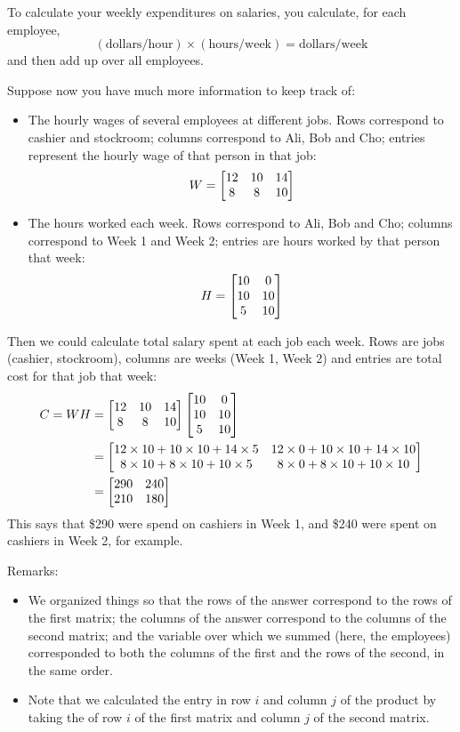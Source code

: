\begin{myexample}
To calculate your weekly expenditures on salaries, you
calculate, for each employee,
$$
(\textrm{dollars/hour}) \times (\textrm{hours/week}) = \textrm{dollars/week}
$$
and then add up over all employees.

Suppose now you have much more information to keep track of:
\begin{itemize} 
\item The hourly wages of several employees at different jobs.  Rows correspond to cashier and stockroom; columns correspond to  Ali, Bob and Cho; entries
represent the hourly wage of that person in that job:
$$
W = \left[ \begin{matrix}  12 & 10 & 14 \\ 8 & 8 & 10 \end{matrix} \right]
$$
\item The hours worked each week.  Rows correspond to Ali, Bob and Cho; columns
correspond to Week 1 and Week 2; entries are hours worked by that person that week:
$$
H = \left[ \begin{matrix} 10 & 0 \\ 10 & 10 \\ 5 & 10 \end{matrix} \right]
$$
\end{itemize}
Then we could calculate total salary spent at each job each week.  Rows are jobs (cashier, stockroom), columns are weeks (Week 1, Week 2) and entries are total cost for that job that week:
\begin{align*}
C = WH & =  \left[ \begin{matrix}  12 & 10 & 14 \\ 8 & 8 & 10 \end{matrix} \right] \left[ \begin{matrix} 10 & 0 \\ 10 & 10 \\ 5 & 10 \end{matrix} \right] \\
&= \left[ \begin{matrix} 12\times 10+10\times 10+14\times 5  &  12\times0+10\times 10+14\times 10\\
8\times 10 + 8 \times 10 + 10\times 5 & 8 \times 0 + 8 \times 10 + 10 \times 10 \end{matrix} \right]
\\
&= \left[ \begin{matrix} 290 & 240\\
210 & 180 \end{matrix} \right] 
\end{align*}
This says that \$290 were spend on cashiers in Week 1, and \$240 were
spent on cashiers in Week 2, for example.   

Remarks:
\begin{itemize}
\item We organized things so that the rows of the answer correspond
to the rows of the first matrix; the columns of the answer correspond
to the columns of the second matrix; and the variable over which we
summed (here, the employees) corresponded to both the columns of 
the first and the rows of the second, in the same order.
\item Note that we calculated the entry in row $i$ and column $j$ of 
the product by taking the  of row $i$ of the
first matrix and column $j$ of the second matrix.
\end{itemize}
\end{myexample}

